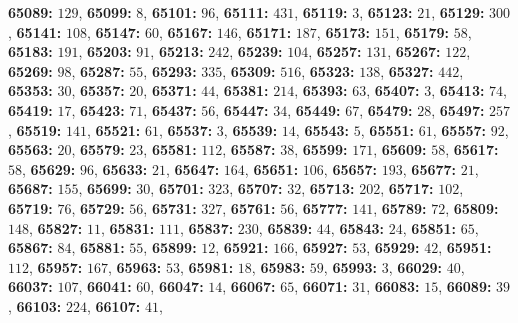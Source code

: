 \textsf{\bfseries 65089:} $129$, \textsf{\bfseries 65099:} $8$, \textsf{\bfseries 65101:} $96$, \textsf{\bfseries 65111:} $431$, \textsf{\bfseries 65119:} $3$, \textsf{\bfseries 65123:} $21$, \textsf{\bfseries 65129:} $300$, \textsf{\bfseries 65141:} $108$, \textsf{\bfseries 65147:} $60$, \textsf{\bfseries 65167:} $146$, \textsf{\bfseries 65171:} $187$, \textsf{\bfseries 65173:} $151$, \textsf{\bfseries 65179:} $58$, \textsf{\bfseries 65183:} $191$, \textsf{\bfseries 65203:} $91$, \textsf{\bfseries 65213:} $242$, \textsf{\bfseries 65239:} $104$, \textsf{\bfseries 65257:} $131$, \textsf{\bfseries 65267:} $122$, \textsf{\bfseries 65269:} $98$, \textsf{\bfseries 65287:} $55$, \textsf{\bfseries 65293:} $335$, \textsf{\bfseries 65309:} $516$, \textsf{\bfseries 65323:} $138$, \textsf{\bfseries 65327:} $442$, \textsf{\bfseries 65353:} $30$, \textsf{\bfseries 65357:} $20$, \textsf{\bfseries 65371:} $44$, \textsf{\bfseries 65381:} $214$, \textsf{\bfseries 65393:} $63$, \textsf{\bfseries 65407:} $3$, \textsf{\bfseries 65413:} $74$, \textsf{\bfseries 65419:} $17$, \textsf{\bfseries 65423:} $71$, \textsf{\bfseries 65437:} $56$, \textsf{\bfseries 65447:} $34$, \textsf{\bfseries 65449:} $67$, \textsf{\bfseries 65479:} $28$, \textsf{\bfseries 65497:} $257$, \textsf{\bfseries 65519:} $141$, \textsf{\bfseries 65521:} $61$, \textsf{\bfseries 65537:} $3$, \textsf{\bfseries 65539:} $14$, \textsf{\bfseries 65543:} $5$, \textsf{\bfseries 65551:} $61$, \textsf{\bfseries 65557:} $92$, \textsf{\bfseries 65563:} $20$, \textsf{\bfseries 65579:} $23$, \textsf{\bfseries 65581:} $112$, \textsf{\bfseries 65587:} $38$, \textsf{\bfseries 65599:} $171$, \textsf{\bfseries 65609:} $58$, \textsf{\bfseries 65617:} $58$, \textsf{\bfseries 65629:} $96$, \textsf{\bfseries 65633:} $21$, \textsf{\bfseries 65647:} $164$, \textsf{\bfseries 65651:} $106$, \textsf{\bfseries 65657:} $193$, \textsf{\bfseries 65677:} $21$, \textsf{\bfseries 65687:} $155$, \textsf{\bfseries 65699:} $30$, \textsf{\bfseries 65701:} $323$, \textsf{\bfseries 65707:} $32$, \textsf{\bfseries 65713:} $202$, \textsf{\bfseries 65717:} $102$, \textsf{\bfseries 65719:} $76$, \textsf{\bfseries 65729:} $56$, \textsf{\bfseries 65731:} $327$, \textsf{\bfseries 65761:} $56$, \textsf{\bfseries 65777:} $141$, \textsf{\bfseries 65789:} $72$, \textsf{\bfseries 65809:} $148$, \textsf{\bfseries 65827:} $11$, \textsf{\bfseries 65831:} $111$, \textsf{\bfseries 65837:} $230$, \textsf{\bfseries 65839:} $44$, \textsf{\bfseries 65843:} $24$, \textsf{\bfseries 65851:} $65$, \textsf{\bfseries 65867:} $84$, \textsf{\bfseries 65881:} $55$, \textsf{\bfseries 65899:} $12$, \textsf{\bfseries 65921:} $166$, \textsf{\bfseries 65927:} $53$, \textsf{\bfseries 65929:} $42$, \textsf{\bfseries 65951:} $112$, \textsf{\bfseries 65957:} $167$, \textsf{\bfseries 65963:} $53$, \textsf{\bfseries 65981:} $18$, \textsf{\bfseries 65983:} $59$, \textsf{\bfseries 65993:} $3$, \textsf{\bfseries 66029:} $40$, \textsf{\bfseries 66037:} $107$, \textsf{\bfseries 66041:} $60$, \textsf{\bfseries 66047:} $14$, \textsf{\bfseries 66067:} $65$, \textsf{\bfseries 66071:} $31$, \textsf{\bfseries 66083:} $15$, \textsf{\bfseries 66089:} $39$, \textsf{\bfseries 66103:} $224$, \textsf{\bfseries 66107:} $41$, 
